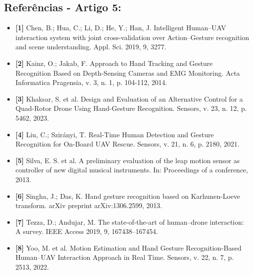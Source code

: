 \documentclass[12pt, a4paper]{article}
\begin{document}
\subsection{Referências - Artigo 5:}
\begin{itemize}[label=]
    \item \textbf{[1]} Chen, B.; Hua, C.; Li, D.; He, Y.; Han, J. Intelligent Human–UAV interaction system with joint cross-validation over Action–Gesture recognition and scene understanding. Appl. Sci. 2019, 9, 3277.
    \item \textbf{[2]} Kainz, O.; Jakab, F. Approach to Hand Tracking and Gesture Recognition Based on Depth-Sensing Cameras and EMG Monitoring. Acta Informatica Pragensia, v. 3, n. 1, p. 104-112, 2014.
    \item \textbf{[3]} Khaksar, S. et al. Design and Evaluation of an Alternative Control for a Quad-Rotor Drone Using Hand-Gesture Recognition. Sensors, v. 23, n. 12, p. 5462, 2023.
    \item \textbf{[4]} Liu, C.; Szirányi, T. Real-Time Human Detection and Gesture Recognition for On-Board UAV Rescue. Sensors, v. 21, n. 6, p. 2180, 2021.
    \item \textbf{[5]} Silva, E. S. et al. A preliminary evaluation of the leap motion sensor as controller of new digital musical instruments. In: Proceedings of a conference, 2013.
    \item \textbf{[6]} Singha, J.; Das, K. Hand gesture recognition based on Karhunen-Loeve transform. arXiv preprint arXiv:1306.2599, 2013.
    \item \textbf{[7]} Tezza, D.; Andujar, M. The state-of-the-art of human–drone interaction: A survey. IEEE Access 2019, 9, 167438–167454.
    \item \textbf{[8]} Yoo, M. et al. Motion Estimation and Hand Gesture Recognition-Based Human–UAV Interaction Approach in Real Time. Sensors, v. 22, n. 7, p. 2513, 2022.
\end{itemize}
\end{document}
